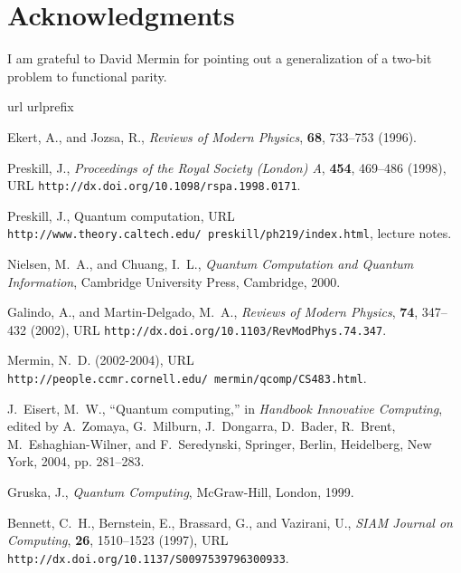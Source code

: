 \section*{Acknowledgments}
I am grateful to David Mermin for pointing out a generalization
of a two-bit problem to functional parity.

%
%
%
%
%
%


\begin{thebibliography}{10}
\providecommand{\enquote}[1]{``#1''}
\expandafter\ifx\csname url\endcsname\relax
  \def\url#1{\texttt{#1}}\fi
\expandafter\ifx\csname urlprefix\endcsname\relax\def\urlprefix{URL }\fi

Ekert, A., and Jozsa, R., \emph{Reviews of Modern Physics}, \textbf{68},
  733--753 (1996).

Preskill, J., \emph{Proceedings of the Royal Society (London) A}, \textbf{454},
  469--486 (1998), \urlprefix\url{http://dx.doi.org/10.1098/rspa.1998.0171}.

Preskill, J., Quantum computation,
  \urlprefix\url{http://www.theory.caltech.edu/~preskill/ph219/index.html},
  lecture notes.

Nielsen, M.~A., and Chuang, I.~L., \emph{Quantum Computation and Quantum
  Information}, Cambridge University Press, Cambridge, 2000.

Galindo, A., and Martin-Delgado, M.~A., \emph{Reviews of Modern Physics},
  \textbf{74}, 347--432 (2002),
  \urlprefix\url{http://dx.doi.org/10.1103/RevModPhys.74.347}.

Mermin, N.~D. (2002-2004),
  \urlprefix\url{http://people.ccmr.cornell.edu/~mermin/qcomp/CS483.html}.

J.~Eisert, M.~W., \enquote{Quantum computing,} in \emph{Handbook Innovative
  Computing}, edited by A.~Zomaya, G.~Milburn, J.~Dongarra, D.~Bader, R.~Brent,
  M.~Eshaghian-Wilner, and F.~Seredynski, Springer, Berlin, Heidelberg, New
  York, 2004, pp. 281--283.

Gruska, J., \emph{Quantum Computing}, McGraw-Hill, London, 1999.

Bennett, C.~H., Bernstein, E., Brassard, G., and Vazirani, U., \emph{SIAM
  Journal on Computing}, \textbf{26}, 1510--1523 (1997),
  \urlprefix\url{http://dx.doi.org/10.1137/S0097539796300933}.


\end{thebibliography}
